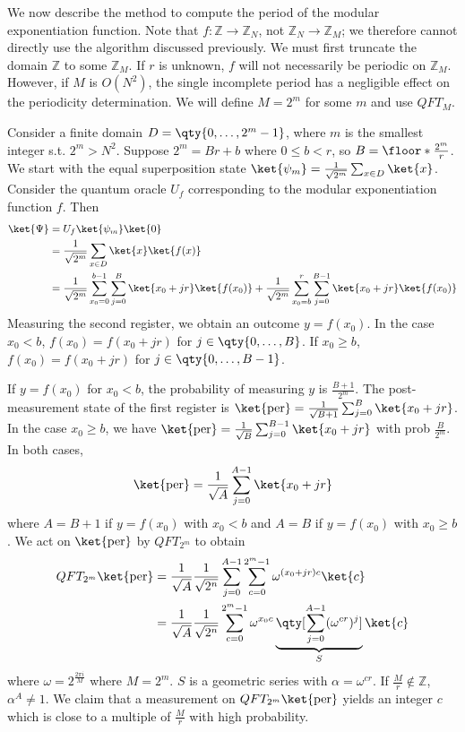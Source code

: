 We now describe the method to compute the period of the modular exponentiation function.
Note that $f \colon \mathbb Z \to \mathbb Z_N$, not $\mathbb Z_N \to \mathbb Z_M$; we therefore cannot directly use the algorithm discussed previously.
We must first truncate the domain $\mathbb Z$ to some $\mathbb Z_M$.
If $r$ is unknown, $f$ will not necessarily be periodic on $\mathbb Z_M$.
However, if $M$ is $O(N^2)$, the single incomplete period has a negligible effect on the periodicity determination.
We will define $M = 2^m$ for some $m$ and use $QFT_M$.

Consider a finite domain $D = \qty{0, \dots, 2^m - 1}$, where $m$ is the smallest integer s.t. $2^m > N^2$.
Suppose $2^m = Br + b$ where $0 \leq b < r$, so $B = \floor*{\frac{2^m}{r}}$.
We start with the equal superposition state $\ket{\psi_m} = \frac{1}{\sqrt{2^m}} \sum_{x \in D} \ket{x}$.
Consider the quantum oracle $U_f$ corresponding to the modular exponentiation function $f$.
Then
\begin{align*}
    \ket{\Psi} &= U_f \ket{\psi_m} \ket{0} \\
    &= \frac{1}{\sqrt{2^m}} \sum_{x \in D} \ket{x} \ket{f(x)} \\
    &= \frac{1}{\sqrt{2^m}} \sum_{x_0 = 0}^{b-1} \sum_{j=0}^B \ket{x_0 + jr} \ket{f(x_0)} + \frac{1}{\sqrt{2^m}} \sum_{x_0 = b}^r \sum_{j=0}^{B-1} \ket{x_0 + jr}\ket{f(x_0)}
\end{align*}
Measuring the second register, we obtain an outcome $y = f(x_0)$.
In the case $x_0 < b$, $f(x_0) = f(x_0 + jr)$ for $j \in \qty{0, \dots, B}$.
If $x_0 \geq b$, $f(x_0) = f(x_0 + jr)$ for $j \in \qty{0, \dots, B - 1}$.

If $y = f(x_0)$ for $x_0 < b$, the probability of measuring $y$ is $\frac{B+1}{2^m}$.
The post-measurement state of the first register is $\ket{\mathrm{per}} = \frac{1}{\sqrt{B+1}} \sum_{j=0}^B \ket{x_0 + jr}$.
In the case $x_0 \geq b$, we have $\ket{\mathrm{per}} = \frac{1}{\sqrt{B}} \sum_{j=0}^{B-1} \ket{x_0 + jr}$ with prob $\frac{B}{2^m}$.
In both cases,
\[ \ket{\mathrm{per}} = \frac{1}{\sqrt{A}} \sum_{j=0}^{A-1} \ket{x_0 + jr} \]
where $A = B+1$ if $y = f(x_0)$ with $x_0 < b$ and $A = B$ if $y = f(x_0)$ with $x_0 \geq b$.
We act on $\ket{\mathrm{per}}$ by $QFT_{2^m}$ to obtain
\begin{align*}
    QFT_{2^m} \ket{\mathrm{per}} &= \frac{1}{\sqrt{A}} \frac{1}{\sqrt{2^n}} \sum_{j = 0}^{A-1} \sum_{c=0}^{2^m - 1} \omega^{(x_0 + jr)c}\ket{c} \\
    &=  \frac{1}{\sqrt{A}} \frac{1}{\sqrt{2^n}} \sum_{c=0}^{2^m - 1} \omega^{x_0 c} \underbrace{\qty[\sum_{j = 0}^{A-1} (\omega^{cr})^j]}_{S} \ket{c} \\
\end{align*}
where $\omega = 2^{\frac{2\pi i}{M}}$ where $M = 2^m$.
$S$ is a geometric series with $\alpha = \omega^{cr}$.
If $\frac{M}{r} \not\in \mathbb Z$, $\alpha^A \neq 1$.
We claim that a measurement on $QFT_{2^m} \ket{\mathrm{per}}$ yields an integer $c$ which is close to a multiple of $\frac{M}{r}$ with high probability.

